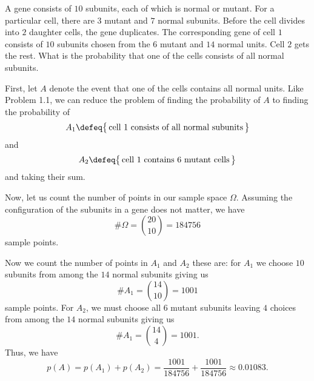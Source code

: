 \begin{problem}
  A gene consists of \(10\) subunits, each of which is normal or
  mutant. For a particular cell, there are \(3\) mutant and \(7\) normal
  subunits. Before the cell divides into \(2\) daughter cells, the gene
  duplicates. The corresponding gene of cell \(1\) consists of \(10\)
  subunits chosen from the \(6\) mutant and \(14\) normal units. Cell \(2\)
  gets the rest. What is the probability that one of the cells consists of
  all normal subunits.
\end{problem}
\begin{solution}
  First, let \(A\) denote the event that one of the cells contains all
  normal units. Like Problem 1.1, we can reduce the problem of finding the
  probability of \(A\) to finding the probability of
  \[
    A_1\defeq\bigl\{\,\text{cell \(1\) consists of all normal subunits}\,\bigr\}
  \]
  and
  \[
    A_2\defeq\bigl\{\,\text{cell \(1\) contains \(6\) mutant cells}\,\bigr\}
  \]
  and taking their sum.

  Now, let us count the number of points in our sample space
  \(\Omega\). Assuming the configuration of the subunits in a gene does not
  matter, we have
  \begin{equation}
    \label{eq:1-4}
      \#\Omega=\binom{20}{10}=184756
  \end{equation}
  sample points.

  Now we count the number of points in \(A_1\) and \(A_2\) these are: for
  \(A_1\) we choose \(10\) subunits from among the \(14\) normal subunits
  giving us
  \begin{equation}
    \label{eq:1-5}
    \#A_1=\binom{14}{10}=1001
  \end{equation}
  sample points. For \(A_2\), we must choose all \(6\) mutant subunits
  leaving \(4\) choices from among the \(14\) normal subunits giving us
  \begin{equation}
    \label{eq:1-6}
    \#A_1=\binom{14}{4}=1001.
  \end{equation}
  Thus, we have
  \[
    p(A)=%
    p(A_1)+p(A_2)=%
    \frac{1001}{184756}+\frac{1001}{184756}\approx%
    0.01083.
  \]
\end{solution}
\newpage

